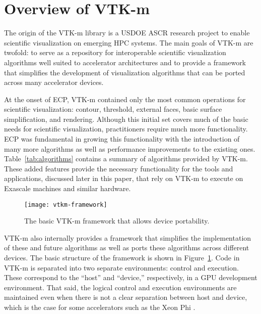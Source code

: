 \section{Overview of VTK-m}


The origin of the VTK-m library \cite{Moreland2016} is a USDOE ASCR research project to enable scientific visualization on emerging HPC systems.
The main goals of VTK-m are twofold: to serve as a repository for interoperable scientific visualization algorithms well suited to accelerator architectures and to provide a framework that simplifies the development of visualization algorithms that can be ported across many accelerator devices.



At the onset of ECP, VTK-m contained only the most common operations for scientific visualization: contour, threshold, external faces, basic surface simplification, and rendering.
Although this initial set covers much of the basic needs for scientific visualization, practitioners require much more functionality.
ECP was fundamental in growing this functionality with the introduction of many more algorithms as well as performance improvements to the existing ones.
Table~\ref{tab:algorithms} contains a summary of algorithms provided by VTK-m.
These added features provide the necessary functionality for the tools and applications, discussed later in this paper, that rely on VTK-m to execute on Exascale machines and similar hardware.

\begin{figure}[htb]
  \texttt{[image: vtkm-framework]}
  \caption{The basic VTK-m framework that allows device portability.}
  \label{fig:vtkm-framework}
\end{figure}

VTK-m also internally provides a framework that simplifies the implementation of these and future algorithms as well as ports these algorithms across different devices.
The basic structure of the framework is shown in Figure~\ref{fig:vtkm-framework}.
Code in VTK-m is separated into two separate environments: control and execution.
These correspond to the ``host'' and ``device,'' respectively, in a GPU development environment.
That said, the logical control and execution environments are maintained even when there is not a clear separation between host and device, which is the case for some accelerators such as the Xeon Phi \cite{Jeffers2016}.

